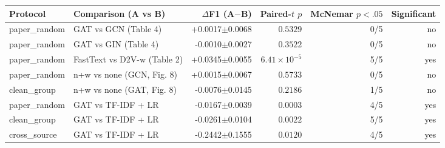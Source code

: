 \begin{tabular}{@{}llrrrr@{}}
\toprule
Protocol & Comparison (A vs B) & $\Delta$F1 (A$-$B) & Paired-$t$ $p$ & McNemar $p<.05$ & Significant \\ \midrule
paper\_random & GAT vs GCN (Table 4) & +0.0017$\pm$0.0068 & $0.5329$ & 0/5 & no \\
paper\_random & GAT vs GIN (Table 4) & -0.0010$\pm$0.0027 & $0.3522$ & 0/5 & no \\
paper\_random & FastText vs D2V-w (Table 2) & +0.0345$\pm$0.0055 & $6.41\times10^{-5}$ & 5/5 & yes \\
paper\_random & n+w vs none (GCN, Fig. 8) & +0.0015$\pm$0.0067 & $0.5733$ & 0/5 & no \\
clean\_group & n+w vs none (GAT, Fig. 8) & -0.0076$\pm$0.0145 & $0.2186$ & 1/5 & no \\
paper\_random & GAT vs TF-IDF + LR & -0.0167$\pm$0.0039 & $0.0003$ & 4/5 & yes \\
clean\_group & GAT vs TF-IDF + LR & -0.0261$\pm$0.0104 & $0.0022$ & 5/5 & yes \\
cross\_source & GAT vs TF-IDF + LR & -0.2442$\pm$0.1555 & $0.0120$ & 4/5 & yes \\
\bottomrule
\end{tabular}
